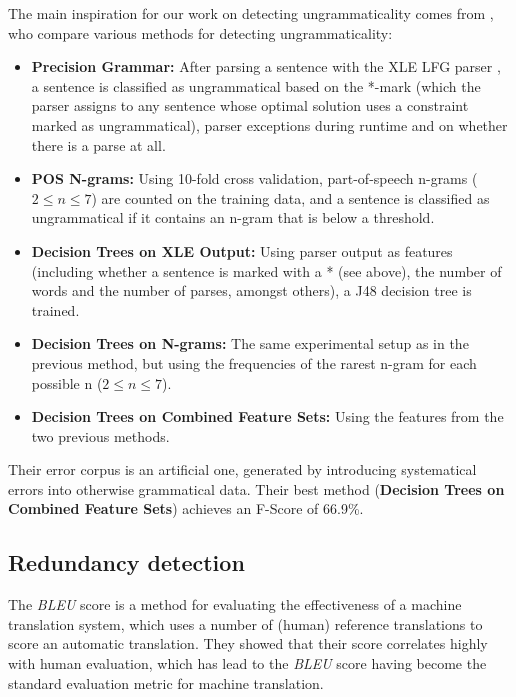 \documentclass[a4paper,10pt]{scrartcl}
\theoremstyle{style}
\begin{document}
The main inspiration for our work on detecting ungrammaticality comes from \cite{wagner2007comparative}, who compare various methods for detecting ungrammaticality:

\begin{itemize}
	\item \textbf{Precision Grammar:} After parsing a sentence with the XLE LFG parser \citep{maxwell1996efficient}, a sentence is classified as ungrammatical based on the *-mark (which the parser assigns to any sentence whose optimal solution uses a constraint marked as ungrammatical), parser exceptions during runtime and on whether there is a parse at all.
	\item \textbf{POS N-grams:} Using 10-fold cross validation, part-of-speech n-grams ($2 \leq n \leq 7$) are counted on the training data, and a sentence is classified as ungrammatical if it contains an n-gram that is below a threshold.
	\item \textbf{Decision Trees on XLE Output:} Using parser output as features (including whether a sentence is marked with a * (see above), the number of words and the number of parses, amongst others), a J48 decision tree is trained.
	\item \textbf{Decision Trees on N-grams:} The same experimental setup as in the previous method, but using the frequencies of the rarest n-gram for each possible n ($2 \leq n \leq 7$).
	\item \textbf{Decision Trees on Combined Feature Sets:} Using the features from the two previous methods.
\end{itemize}

Their error corpus is an artificial one, generated by introducing systematical errors into otherwise grammatical data. Their best method (\textbf{Decision Trees on Combined Feature Sets}) achieves an F-Score of 66.9\%.

\subsection{Redundancy detection}

The \textit{BLEU} score \citep{papineni2002bleu} is a method for evaluating the effectiveness of a machine translation system, which uses a number of (human) reference translations to score an automatic translation. They showed that their score correlates highly with human evaluation, which has lead to the \textit{BLEU} score having become the standard evaluation metric for machine translation.
\end{document}
